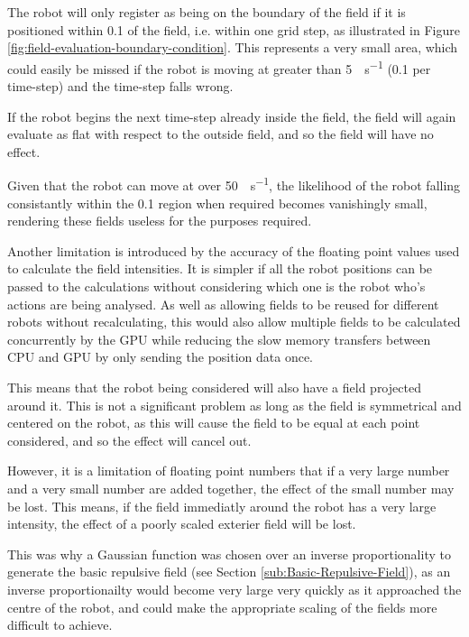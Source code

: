 \documentclass[10pt]{article}
\begin{document}
The robot will only register as being on the boundary of the field if it is
positioned within \SI{0.1}{\inch} of the field, i.e. within one grid step, as
illustrated in Figure \ref{fig:field-evaluation-boundary-condition}.  This
represents a very small area, which could easily be missed if the robot is
moving at greater than \SI{5}{\inch\per\second} (\SI{0.1}{\inch} per time-step)
and the time-step falls wrong.

If the robot begins the next time-step already inside the field, the field will
again evaluate as flat with respect to the outside field, and so the field will
have no effect.

Given that the robot can move at over \SI{50}{\inch\per\second}, the likelihood
of the robot falling consistantly within the \SI{0.1}{\inch} region when
required becomes vanishingly small, rendering these fields useless for the
purposes required.

Another limitation is introduced by the accuracy of the floating point values
used to calculate the field intensities.  It is simpler if all the robot
positions can be passed to the calculations without considering which one is the
robot who's actions are being analysed.  As well as allowing fields to be reused
for different robots without recalculating, this would also allow multiple
fields to be calculated concurrently by the GPU while reducing the slow
memory transfers between CPU and GPU by only sending the position data
once.

This means that the robot being considered will also have a field projected
around it.  This is not a significant problem as long as the field is
symmetrical and centered on the robot, as this will cause the field to be equal
at each point considered, and so the effect will cancel out.

However, it is a limitation of floating point numbers that if a very large
number and a very small number are added together, the effect of the small
number may be lost.  This means, if the field immediatly around the robot has a
very large intensity, the effect of a poorly scaled exterier field will be lost.

This was why a Gaussian function was chosen over an inverse proportionality to
generate the basic repulsive field (see Section
\ref{sub:Basic-Repulsive-Field}), as an inverse proportionailty would become
very large very quickly as it approached the centre of the robot, and could make
the appropriate scaling of the fields more difficult to achieve.
\end{document}
